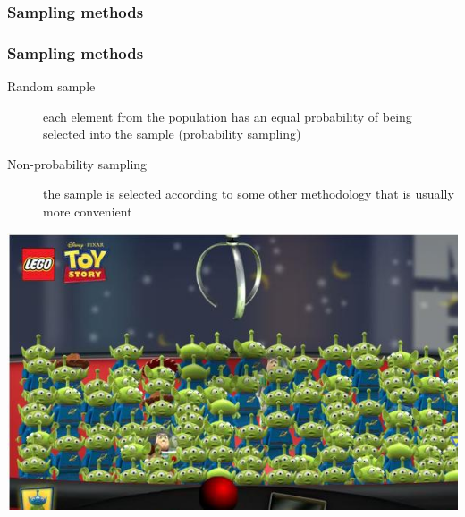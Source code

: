 \documentclass{beamer}
\begin{document}
\begin{frame}
  \frametitle{Sampling methods}
  \begin{center}
  \end{center}

\end{frame}

\begin{frame}
  \frametitle{Sampling methods}

  \begin{description}
    \item[Random sample] each element from the population has an equal probability of being selected into the sample (probability sampling)
    \item[Non-probability sampling] the sample is selected according to some other methodology that is usually more convenient
  \end{description}

  \begin{center}
    \includegraphics[width=.5\textwidth]{img/les4-aselect}
  \end{center}
\end{frame}
\end{document}
